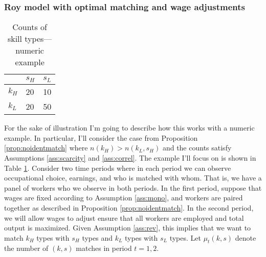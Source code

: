 \documentclass[12 pt]{article}
\begin{document}
\subsubsection{Roy model with optimal matching and wage adjustments}
\begin{table}[H]
	\centering
	\begin{tabular}{l|ll}
		& $s_H$        & $s_L$        \\ \hline
		$k_H$ & 20 & 10 \\
		$k_L$ & 20 & 50
		
	\end{tabular}
	\caption{Counts of skill types---numeric example}
	\label{tab:2by2countsex}
\end{table}
For the sake of illustration I'm going to describe how this works with a numeric example. In particular, I'll consider the case from Proposition \ref{prop:noidentmatch} where $n(k_H) > n(k_L,s_H)$ and the counts satisfy Assumptions \ref{ass:scarcity} and \ref{ass:correl}. The example I'll focus on is shown in Table \ref{tab:2by2countsex}. Consider two time periods where in each period we can observe occupational choice, earnings, and who is matched with whom. That is, we have a panel of workers who we observe in both periods. In the first period, suppose that wages are fixed according to Assumption \ref{ass:mono}, and workers are paired together as described in Proposition \ref{prop:noidentmatch}. In the second period, we will allow wages to adjust ensure that all workers are employed and total output is maximized. Given Assumption \ref{ass:rev}, this implies that we want to match $k_H$ types with $s_H$ types and $k_L$ types with $s_L$ types. Let $\mu_t(k,s)$ denote the number of $(k,s)$ matches in period $t=1,2$. 
\end{document}
